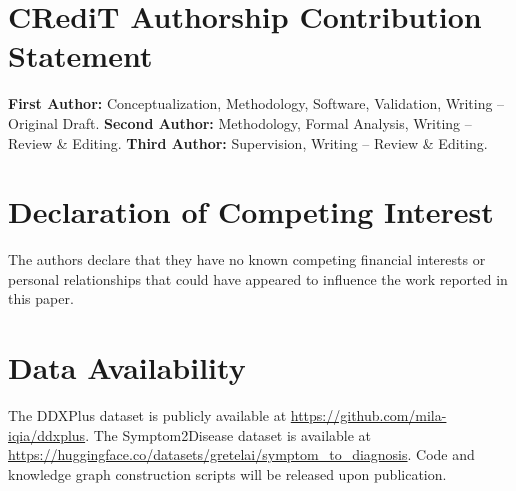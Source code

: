 \documentclass[preprint,12pt]{elsarticle}
\begin{document}
\section*{CRediT Authorship Contribution Statement}

\textbf{First Author:} Conceptualization, Methodology, Software, Validation, Writing -- Original Draft.
\textbf{Second Author:} Methodology, Formal Analysis, Writing -- Review \& Editing.
\textbf{Third Author:} Supervision, Writing -- Review \& Editing.

\section*{Declaration of Competing Interest}

The authors declare that they have no known competing financial interests or personal relationships that could have appeared to influence the work reported in this paper.

\section*{Data Availability}

The DDXPlus dataset is publicly available at \url{https://github.com/mila-iqia/ddxplus}. The Symptom2Disease dataset is available at \url{https://huggingface.co/datasets/gretelai/symptom_to_diagnosis}. Code and knowledge graph construction scripts will be released upon publication.


\end{document}
